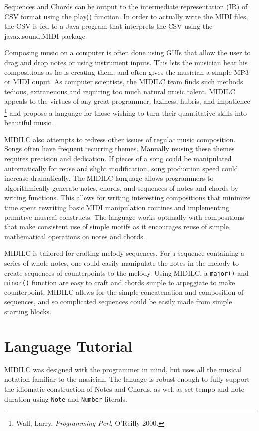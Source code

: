 \documentclass[12pt,A4]{book}
\begin{document}
Sequences and Chords can be output to the intermediate representation (IR) of CSV format using the play() function. In order to actually write the MIDI files, the CSV is fed to a Java program that interprets the CSV using the javax.sound.MIDI package.

Composing music on a computer is often done using GUIs that allow the user to drag and drop notes or using instrument inputs. This lets the musician hear his compositions as he is creating them, and often gives the musician a simple MP3 or MIDI ouput. As computer scientists, the MIDILC team finds such methods tedious, extraneuous and requiring too much natural music talent. MIDILC appeals to the virtues of any great programmer: laziness, hubris, and impatience \footnote{Wall, Larry. \textit{Programming Perl}, O'Reilly 2000.} and propose a language for those wishing to turn their quantitative skills into beautiful music.

MIDILC also attempts to redress other issues of regular music composition. Songs often have frequent recurring themes. Manually reusing these themes requires precision and dedication. If pieces of a song could be manipulated automatically for reuse and slight modification, song production speed could increase dramatically. The MIDILC language allows programmers to algorithmically generate notes, chords, and sequences of notes and chords by writing functions. This allows for writing interesting compositions that minimize time spent rewriting basic MIDI manipulation routines and implementing primitive musical constructs. The language works optimally with compositions that make consistent use of simple motifs as it encourages reuse of simple mathematical operations on notes and chords. 

MIDILC is tailored for crafting melody sequences. For a sequence containing a series of whole notes, one could easily manipulate the notes in the melody to create sequences of counterpoints to the melody. Using MIDILC, a \verb|major()| and \verb|minor()| function are easy to craft and chords simple to arpeggiate to make counterpoint. MIDILC allows for the simple concatenation and composition of sequences, and so complicated sequences could be easily made from simple starting blocks.

\chapter{Language Tutorial}
MIDILC was designed with the programmer in mind, but uses all the musical notation familiar to the musician. The lanuage is robust enough to fully support the idiomatic construction of Notes and Chords, as well as set tempo and note duration using \verb|Note| and \verb|Number| literals.
\end{document}
